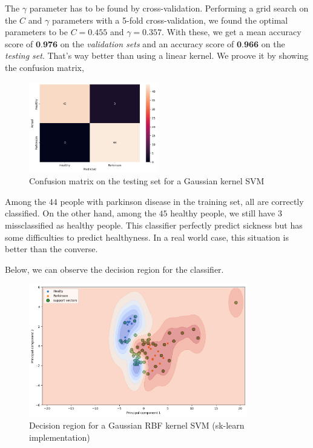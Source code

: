 The $\gamma$ parameter has to be found by cross-validation. Performing a grid search on the $C$ and $\gamma$ parameters with a 5-fold cross-validation, we found the optimal parameters to be $C = 0.455$ and $\gamma = 0.357$. With these, we get a mean accuracy score of $\textbf{0.976}$ on the \textit{validation sets} and an accuracy score of $\textbf{0.966}$ on the \textit{testing set}. That's way better than using a linear kernel. We proove it by showing the confusion matrix, 

\begin{figure}[H]
	\centering
	\includegraphics[width=0.5\textwidth]{figures/kernel_svm_cm.png}
	\caption{Confusion matrix on the testing set for a Gaussian kernel SVM}
	\label{fig:kernel-svm-cm}
\end{figure}

Among the $44$ people with parkinson disease in the training set, all are correctly classified. On the other hand, among the $45$ healthy people, we still have $3$ missclassified as healthy people. This classifier perfectly predict sickness but has some difficulties to predict healthyness. In a real world case, this situation is better than the converse.

Below, we can observe the decision region for the classifier.
\begin{figure}[H]
	\centering
	\includegraphics[width=0.85\textwidth]{figures/kernel_svm_region.png}
	\caption{Decision region for a Gaussian RBF kernel SVM (sk-learn implementation)}
	\label{fig:kernel-svm-region}
\end{figure}

